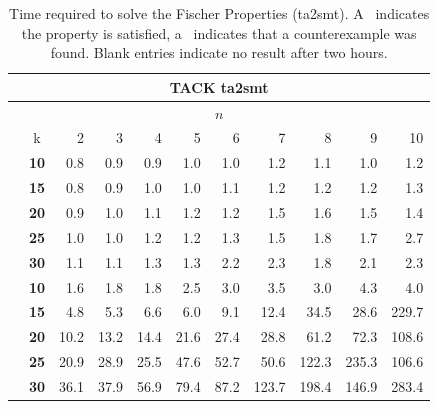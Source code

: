 \documentclass[a4paper,11pt]{report}
\newcommand*\cmark{\small\Checkmark}
\newcommand*{\xmark}{\small\XSolidBrush}
\theoremstyle{definition}
\begin{document}
\begin{table}
\begin{tabular}{c|c|r r r r r r r r r}
\end{tabular}
\end{table}



\begin{table}
\footnotesize
{}
\centering
\caption{Time required to solve the Fischer Properties (ta2smt). A \cmark\
  indicates the property is satisfied, a \xmark\ indicates that a counterexample
  was found. Blank entries indicate no result after two hours.}
\label{table:fischer-results-ta2smt}
\begin{tabular}{c|c|r r r r r r r r r}
\midrule
\multicolumn{11}{c}{TACK ta2smt} \\
\midrule
\multicolumn{11}{c}{\(n\)} \\
\midrule
& k & 2 & 3 & 4 & 5 & 6 & 7 & 8 & 9 & 10 \\
\midrule
\multirow{5}{1em}{\rotatebox{90}{\textbf{live-one}}}
 & \textbf{10} & 0.8\cmark & 0.9\cmark & 0.9\cmark & 1.0\cmark & 1.0\cmark & 1.2\cmark & 1.1\cmark & 1.0\cmark & 1.2\cmark \\
 & \textbf{15} & 0.8\cmark & 0.9\cmark & 1.0\cmark & 1.0\cmark & 1.1\cmark & 1.2\cmark & 1.2\cmark & 1.2\cmark & 1.3\cmark \\
 & \textbf{20} & 0.9\cmark & 1.0\cmark & 1.1\cmark & 1.2\cmark & 1.2\cmark & 1.5\cmark & 1.6\cmark & 1.5\cmark & 1.4\cmark \\
 & \textbf{25} & 1.0\cmark & 1.0\cmark & 1.2\cmark & 1.2\cmark & 1.3\cmark & 1.5\cmark & 1.8\cmark & 1.7\cmark & 2.7\cmark \\
 & \textbf{30} & 1.1\cmark & 1.1\cmark & 1.3\cmark & 1.3\cmark & 2.2\cmark & 2.3\cmark & 1.8\cmark & 2.1\cmark & 2.3\cmark \\
  \midrule
\multirow{5}{1em}{\rotatebox{90}{\textbf{live-two}}}
  & \textbf{10} & 1.6\cmark & 1.8\cmark & 1.8\cmark & 2.5\cmark & 3.0\cmark & 3.5\cmark & 3.0\cmark & 4.3\cmark & 4.0\cmark \\
  & \textbf{15} & 4.8\cmark & 5.3\cmark & 6.6\cmark & 6.0\cmark & 9.1\cmark & 12.4\cmark & 34.5\cmark & 28.6\cmark & 229.7\cmark \\
  & \textbf{20} & 10.2\cmark & 13.2\cmark & 14.4\cmark & 21.6\cmark & 27.4\cmark & 28.8\cmark & 61.2\cmark & 72.3\cmark & 108.6\cmark \\
  & \textbf{25} & 20.9\cmark & 28.9\cmark & 25.5\cmark & 47.6\cmark & 52.7\cmark & 50.6\cmark & 122.3\cmark & 235.3\cmark & 106.6\cmark \\
  & \textbf{30} & 36.1\cmark & 37.9\cmark & 56.9\cmark & 79.4\cmark & 87.2\cmark & 123.7\cmark & 198.4\cmark & 146.9\cmark & 283.4\cmark \\
  \midrule


\end{tabular}
\end{table}
\end{document}
